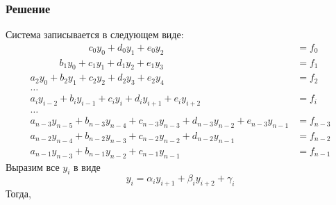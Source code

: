 \documentclass[a4paper, fontsize=14pt]{article}
\begin{document}
\subsubsection*{Решение}
Система записывается в следующем виде:
\begin{equation*}
    \begin{aligned}
        \qquad \qquad \qquad c_0y_0+d_0y_1+e_0y_2                                  & =f_0     \\
        \qquad \quad b_1y_0+c_1y_1+d_1y_2+e_1y_3                                   & =f_1     \\
        a_2y_{0}+b_2y_{1}+c_2y_{2}+d_2y_{3}+e_2y_{4}                               & =f_2     \\
        \dots                                                                                 \\
        a_iy_{i-2}+b_iy_{i-1}+c_iy_{i}+d_iy_{i+1}+e_iy_{i+2}                       & =f_i     \\
        \dots                                                                                 \\
        a_{n-3}y_{n-5}+b_{n-3}y_{n-4}+c_{n-3}y_{n-3}+d_{n-3}y_{n-2}+e_{n-3}y_{n-1} & =f_{n-3} \\
        a_{n-2}y_{n-4}+b_{n-2}y_{n-3}+c_{n-2}y_{n-2}+d_{n-2}y_{n-1}                & =f_{n-2} \\
        a_{n-1}y_{n-3}+b_{n-1}y_{n-2}+c_{n-1}y_{n-1}                               & =f_{n-1}
    \end{aligned}
\end{equation*}
Выразим все $y_i$ в виде
\begin{equation*}
    y_i=\alpha_iy_{i+1}+\beta_iy_{i+2}+\gamma_i
\end{equation*}
Тогда,
\end{document}
